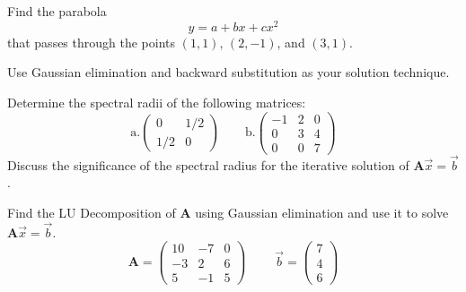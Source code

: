\documentclass[12pt, answers]{exam}
\newcommand{\ve}[1]{\ensuremath{\mathbf{#1}}}
\begin{document}
\begin{questions}
\vspace*{3em}
\addpoints
\question[10] Find the parabola
\[ y = a + bx + cx^2\]
that passes through the points $(1,1)$, $(2,-1)$, and $(3,1)$. 

Use Gaussian elimination and backward substitution as your solution technique.


\vspace*{3em}
\addpoints
\question[10] Determine the spectral radii of the following matrices:
%
\begin{equation}
\text{a.} \begin{pmatrix}
   0   & 1/2 \\
   1/2 &  0  
\end{pmatrix} \qquad
%
\text{b.} \begin{pmatrix}
  -1 &  2 & 0 \\
   0 &  3 & 4 \\
   0 &  0 & 7
\end{pmatrix} \nonumber
\end{equation}
%
Discuss the significance of the spectral radius for the iterative solution of $\ve{A}\vec{x} = \vec{b}$.


\vspace*{3em}
\addpoints
\question[10] Find the LU Decomposition of $\ve{A}$ using Gaussian elimination and use it to solve $\ve{A}\vec{x} = \vec{b}$.
%
\begin{equation}
\ve{A} = \begin{pmatrix}
  10 & -7 & 0 \\
  -3 &  2 & 6 \\
   5 & -1 & 5
\end{pmatrix} \; \qquad
%
\vec{b} = \begin{pmatrix} 7 \\ 4 \\ 6 \end{pmatrix} \nonumber
\end{equation}


\end{questions}
\end{document}

